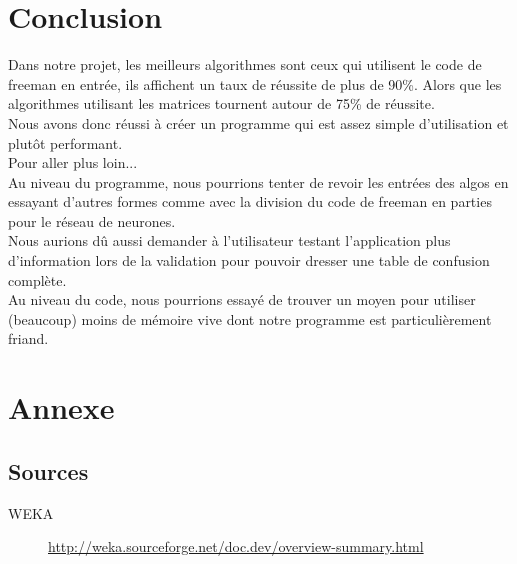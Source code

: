 \documentclass[10pt,a4paper]{report}
\begin{document}

\section{Conclusion}
\begin{flushleft}
Dans notre projet, les meilleurs algorithmes sont ceux qui utilisent le code de freeman en entrée, ils affichent un taux de réussite de plus de 90\%. Alors que les algorithmes utilisant les matrices tournent autour de 75\% de réussite.\\
Nous avons donc réussi à créer un programme qui est assez simple d'utilisation et plutôt performant.\\
\vspace*{0.3cm}
Pour aller plus loin...\\
\vspace*{0.1cm}
Au niveau du programme, nous pourrions tenter de revoir les entrées des algos en essayant d'autres formes comme avec la division du code de freeman en parties pour le réseau de neurones.\\
Nous aurions dû aussi demander à l'utilisateur testant l'application plus d'information lors de la validation pour pouvoir dresser une table de confusion complète.\\
\vspace*{0.1cm}
Au niveau du code, nous pourrions essayé de trouver un moyen pour utiliser (beaucoup) moins de mémoire vive dont notre programme est particulièrement friand.\\
\end{flushleft}



\section{Annexe}
\subsection*{Sources}
\begin{description}
	\item[WEKA] \url{http://weka.sourceforge.net/doc.dev/overview-summary.html}
\end{description}
\newpage
\end{document}
